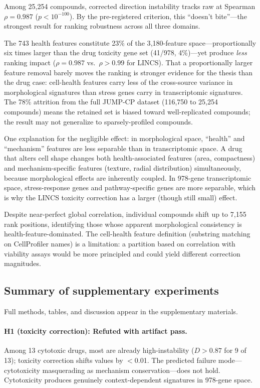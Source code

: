 \documentclass{article}
\begin{document}
Among 25{,}254 compounds, corrected direction instability tracks raw
at Spearman $\rho = 0.987$ ($p < 10^{-100}$). By the pre-registered
criterion, this ``doesn't bite''---the strongest result for ranking
robustness across all three domains.

The 743 health features constitute 23\% of the 3{,}180-feature
space---proportionally six times larger than the drug toxicity gene set
(41/978, 4\%)---yet produce \emph{less} ranking impact ($\rho = 0.987$
vs.\ $\rho > 0.99$ for LINCS). That a proportionally larger feature
removal barely moves the ranking is stronger evidence for the thesis than
the drug case: cell-health features carry less of the cross-source
variance in morphological signatures than stress genes carry in
transcriptomic signatures. The 78\% attrition from the full JUMP-CP
dataset (116{,}750 to 25{,}254 compounds) means the retained set is
biased toward well-replicated compounds; the result may not generalize
to sparsely-profiled compounds.

One explanation for the negligible effect: in morphological space,
``health'' and ``mechanism'' features are less separable than in
transcriptomic space. A drug that alters cell shape changes both
health-associated features (area, compactness) and mechanism-specific
features (texture, radial distribution) simultaneously, because
morphological effects are inherently coupled. In 978-gene transcriptomic
space, stress-response genes and pathway-specific genes are more
separable, which is why the LINCS toxicity correction has a larger
(though still small) effect.

Despite near-perfect global correlation, individual compounds shift up
to 7{,}155 rank positions, identifying those whose apparent morphological
consistency is health-feature-dominated. The cell-health feature
definition (substring matching on CellProfiler names) is a limitation:
a partition based on correlation with viability assays would be more
principled and could yield different correction magnitudes.

\subsection{Summary of supplementary experiments}

Full methods, tables, and discussion appear in the supplementary materials.

\paragraph{H1 (toxicity correction): Refuted with artifact pass.}
Among 13 cytotoxic drugs, most are already high-instability ($D > 0.87$
for 9 of 13); toxicity correction shifts values by $<$0.01. The predicted
failure mode---cytotoxicity masquerading as mechanism conservation---does
not hold. Cytotoxicity produces genuinely context-dependent signatures in
978-gene space.
\end{document}
